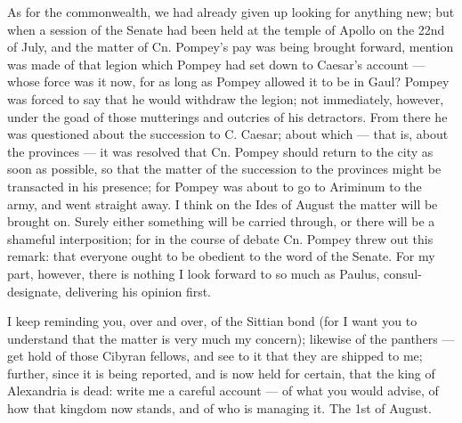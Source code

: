  As for the commonwealth, we had already given up looking for anything new; but when a session of the Senate had been held at the temple of Apollo on the 22nd of July, and the matter of Cn. Pompey's pay was being brought forward, mention was made of that legion which Pompey had set down to Caesar's account --- whose force was it now, for as long as Pompey allowed it to be in Gaul? Pompey was forced to say that he would withdraw the legion; not immediately, however, under the goad of those mutterings and outcries of his detractors. From there he was questioned about the succession to C. Caesar; about which --- that is, about the provinces --- it was resolved that Cn. Pompey should return to the city as soon as possible, so that the matter of the succession to the provinces might be transacted in his presence; for Pompey was about to go to Ariminum to the army, and went straight away. I think on the Ides of August the matter will be brought on. Surely either something will be carried through, or there will be a shameful interposition; for in the course of debate Cn. Pompey threw out this remark: that everyone ought to be obedient to the word of the Senate. For my part, however, there is nothing I look forward to so much as Paulus, consul-designate, delivering his opinion first.

 I keep reminding you, over and over, of the Sittian bond (for I want you to understand that the matter is very much my concern); likewise of the panthers --- get hold of those Cibyran fellows, and see to it that they are shipped to me; further, since it is being reported, and is now held for certain, that the king of Alexandria is dead: write me a careful account --- of what you would advise, of how that kingdom now stands, and of who is managing it. The 1st of August.

